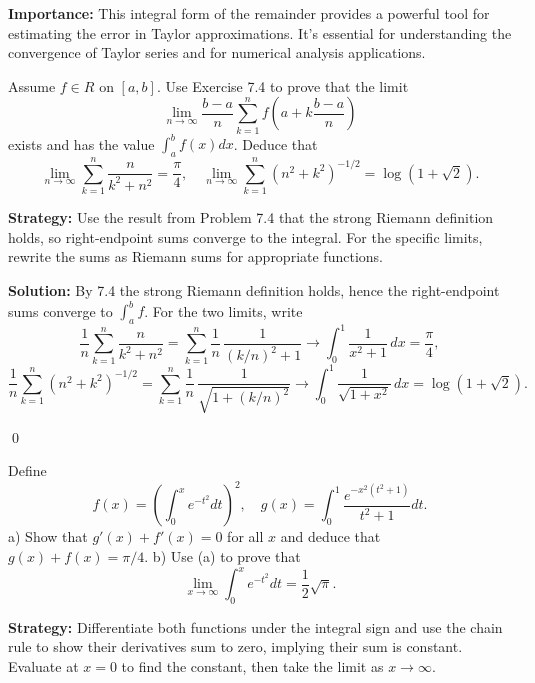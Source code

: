 \noindent\textbf{Importance:} This integral form of the remainder provides a powerful tool for estimating the error in Taylor approximations. It's essential for understanding the convergence of Taylor series and for numerical analysis applications.




\begin{problembox}
\begin{problemstatement}
Assume $f \in R$ on $[a, b]$. Use Exercise 7.4 to prove that the limit 
\[\lim_{n \to \infty} \frac{b - a}{n} \sum_{k=1}^{n} f \left( a + k \frac{b - a}{n} \right)\]
exists and has the value $\int_a^b f(x) dx$. Deduce that 
\[\lim_{n \to \infty} \sum_{k=1}^{n} \frac{n}{k^2 + n^2} = \frac{\pi}{4}, \quad \lim_{n \to \infty} \sum_{k=1}^{n} (n^2 + k^2)^{-1/2} = \log (1 + \sqrt{2}).\]
\end{problemstatement}
\end{problembox}

\noindent\textbf{Strategy:} Use the result from Problem 7.4 that the strong Riemann definition holds, so right-endpoint sums converge to the integral. For the specific limits, rewrite the sums as Riemann sums for appropriate functions.

\bigskip\noindent\textbf{Solution:}
By 7.4 the strong Riemann definition holds, hence the right-endpoint sums converge to $\int_a^b f$. For the two limits, write
\[\frac{1}{n}\sum_{k=1}^n \frac{n}{k^2+n^2}=\sum_{k=1}^n \frac{1}{n}\,\frac{1}{(k/n)^2+1}\to \int_0^1 \frac{1}{x^2+1}\,dx=\frac{\pi}{4},\]
\[\frac{1}{n}\sum_{k=1}^n (n^2+k^2)^{-1/2}=\sum_{k=1}^n \frac{1}{n}\,\frac{1}{\sqrt{1+(k/n)^2}}\to \int_0^1 \frac{1}{\sqrt{1+x^2}}\,dx=\log(1+\sqrt2).
\]




\qed
\begin{problembox}
\begin{problemstatement}
Define 
\[f(x) = \left( \int_0^x e^{-t^2} dt \right)^2, \quad g(x) = \int_0^1 \frac{e^{-x^2(t^2+1)}}{t^2 + 1} dt.\]
a) Show that $g'(x) + f'(x) = 0$ for all $x$ and deduce that $g(x) + f(x) = \pi / 4$.
b) Use (a) to prove that 
\[\lim_{x \to \infty} \int_0^x e^{-t^2} dt = \frac{1}{2} \sqrt{\pi}.\]
\end{problemstatement}
\end{problembox}

\noindent\textbf{Strategy:} Differentiate both functions under the integral sign and use the chain rule to show their derivatives sum to zero, implying their sum is constant. Evaluate at $x = 0$ to find the constant, then take the limit as $x \to \infty$.

